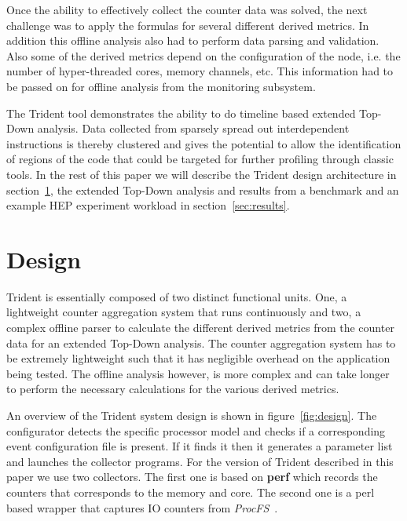 \documentclass{webofc}
\begin{document}
Once the ability to effectively collect the counter data was solved, the next challenge was to apply the formulas for several different derived metrics. In addition this offline analysis also had to perform data parsing and validation. Also some of the derived metrics depend on the configuration of the node, i.e. the number of hyper-threaded cores, memory channels, etc. This information had to be passed on for offline analysis from the monitoring subsystem. 

The Trident tool demonstrates the ability to do timeline based extended Top-Down analysis. Data collected from sparsely spread out interdependent instructions is thereby clustered and gives the potential to allow the identification of regions of the code that could be targeted for further profiling through classic tools. In the rest of this paper we will describe the Trident design architecture in section~\ref{sec:design}, the extended Top-Down analysis and results from a benchmark and an example HEP experiment workload in section~\ref{sec:results}.


\section{Design}
\label{sec:design}

Trident is essentially composed of two distinct functional units. One, a lightweight counter aggregation system that runs continuously and two, a complex offline parser to calculate the different derived metrics from the counter data for an extended Top-Down analysis. The counter aggregation system has to be extremely lightweight such that it has negligible overhead on the application being tested. The offline analysis however, is more complex and can take longer to perform the necessary calculations for the various derived metrics. 

An overview of the Trident system design is shown in figure~\ref{fig:design}. The configurator detects the specific processor model and checks if a corresponding event configuration file is present. If it finds it then it generates a parameter list and launches the collector programs. For the version of Trident described in this paper we use two collectors. The first one is based on \textbf{perf} which records the counters that corresponds to the memory and core. The second one is a perl based wrapper that captures IO counters from \textit{ProcFS}~\cite{bovet2005understanding}.
\end{document}
